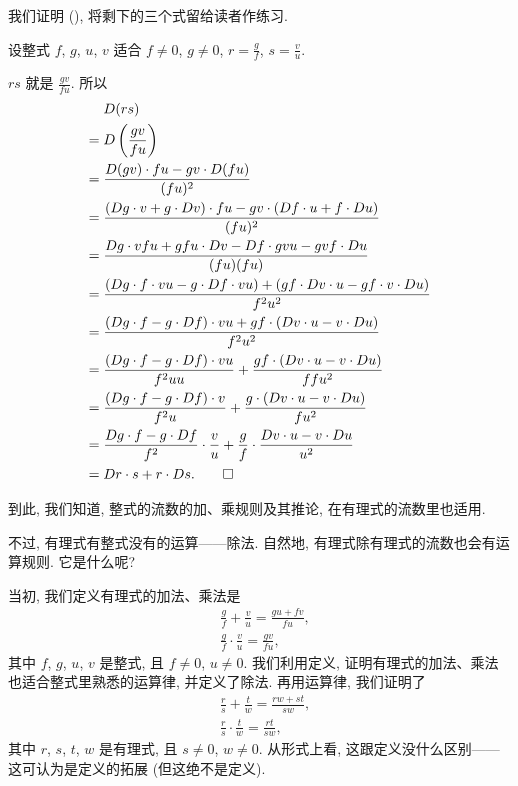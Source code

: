 \begin{pf}
    我们证明 (\myStar), 将剩下的三个式留给读者作练习.

    设整式 $f$, $g$, $u$, $v$ 适合 $f \neq 0$, $g \neq 0$, $r = \frac{g}{f}$, $s = \frac{v}{u}$.

    $rs$ 就是 $\frac{gv}{fu}$. 所以
    \begin{align*}
             & D(rs)                                                                                                         \\
        = {} & D \left( \frac{gv}{fu} \right)                                                                                \\
        = {} & \frac{D(gv) \cdot fu - gv \cdot D(fu)}{(fu)^2}                                                                \\
        = {} & \frac{(Dg \cdot v + g \cdot Dv) \cdot fu - gv \cdot (Df \cdot u + f \cdot Du)}{(fu)^2}                        \\
        = {} & \frac{Dg \cdot vfu + gfu \cdot Dv - Df \cdot gvu - gvf \cdot Du}{(fu)(fu)}                                    \\
        = {} & \frac{(Dg \cdot f \cdot vu - g \cdot Df \cdot vu) + (gf \cdot Dv \cdot u - gf \cdot v \cdot Du)}{f^2 u^2}     \\
        = {} & \frac{(Dg \cdot f - g \cdot Df) \cdot vu + gf \cdot (Dv \cdot u - v \cdot Du)}{f^2 u^2}                       \\
        = {} & \frac{(Dg \cdot f - g \cdot Df) \cdot vu}{f^2 uu} + \frac{gf \cdot (Dv \cdot u - v \cdot Du)}{ff u^2}         \\
        = {} & \frac{(Dg \cdot f - g \cdot Df) \cdot v}{f^2 u} + \frac{g \cdot (Dv \cdot u - v \cdot Du)}{f u^2}             \\
        = {} & \frac{Dg \cdot f - g \cdot Df}{f^2} \cdot \frac{v}{u} + \frac{g}{f} \cdot \frac{Dv \cdot u - v \cdot Du}{u^2} \\
        = {} & Dr \cdot s + r \cdot Ds. \qedhere
    \end{align*}
\end{pf}

到此, 我们知道, 整式的流数的加、乘规则及其推论, 在有理式的流数里也适用.

不过, 有理式有整式没有的运算——除法. 自然地, 有理式除有理式的流数也会有运算规则. 它是什么呢?

当初, 我们定义有理式的加法、乘法是
\begin{align*}
     & \frac{g}{f} + \frac{v}{u} = \frac{gu + fv}{fu}, \\
     & \frac{g}{f} \cdot \frac{v}{u} = \frac{gv}{fu},
\end{align*}
其中 $f$, $g$, $u$, $v$ 是整式, 且 $f \neq 0$, $u \neq 0$. 我们利用定义, 证明有理式的加法、乘法也适合整式里熟悉的运算律, 并定义了除法. 再用运算律, 我们证明了
\begin{align*}
     & \frac{r}{s} + \frac{t}{w} = \frac{rw + st}{sw}, \\
     & \frac{r}{s} \cdot \frac{t}{w} = \frac{rt}{sw},
\end{align*}
其中 $r$, $s$, $t$, $w$ 是有理式, 且 $s \neq 0$, $w \neq 0$. 从形式上看, 这跟定义没什么区别——这可认为是定义的拓展 (但这绝不是定义).

